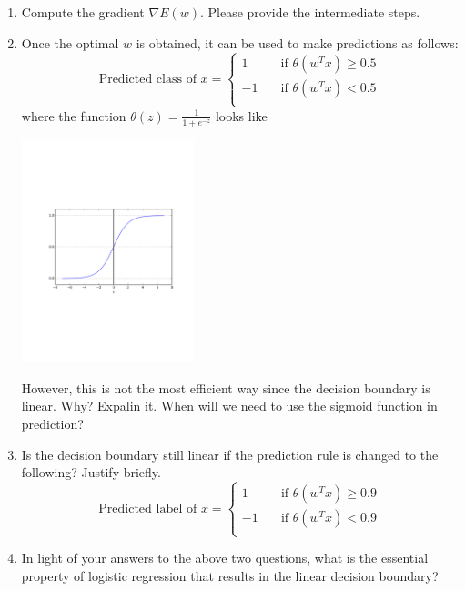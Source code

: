 \documentclass[11pt]{article}
\begin{document}
\begin{enumerate}
\begin{enumerate}
        \item Compute the gradient $\nabla E(w)$. Please provide the intermediate steps.

        \item Once the optimal $w$ is obtained, it can be used to make predictions as follows:
        \[ \mbox{Predicted class of }x =
        \begin{cases}
        1       & \quad \text{if } \theta(w^Tx)\geq 0.5\\
        -1  & \quad \text{if } \theta(w^Tx)<0.5\\
        \end{cases}
        \]
        where the function $\theta(z)=\frac{1}{1+e^{-z}}$ looks like
        \begin{center}
            \includegraphics[width=5cm]{sigmoid.pdf}
        \end{center}
        However, this is not the most efficient way since the decision boundary is linear. Why? Expalin it. When will we need to use the sigmoid function in prediction?

        \item Is the decision boundary still linear if the prediction rule
        is changed to the following? Justify briefly.
        \[ \mbox{Predicted label of }x =
        \begin{cases}
        1       & \quad \text{if } \theta(w^Tx)\geq 0.9\\
        -1  & \quad \text{if } \theta(w^Tx)<0.9\\
        \end{cases}
        \]

        \item In light of your answers to the above two questions, what is the essential property of logistic regression that results in the linear decision boundary?
    \end{enumerate}


\end{enumerate}
\end{document}
